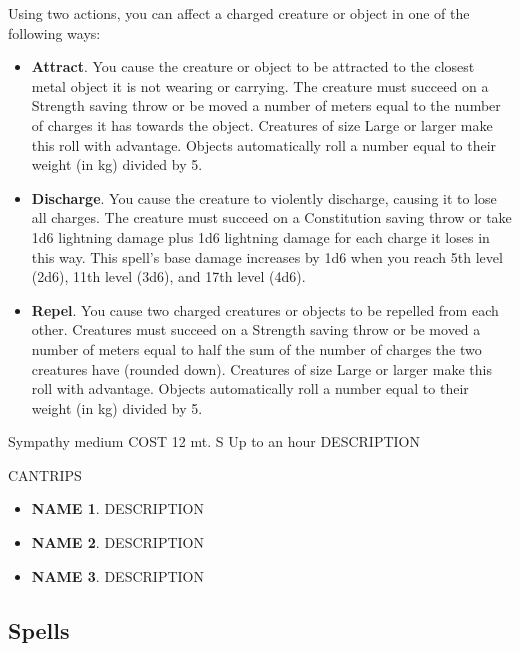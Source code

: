         Using two actions, you can affect a charged creature or object in one of the following ways:
        \begin{itemize}
            \item \textbf{Attract}.
            You cause the creature or object to be attracted to the closest metal object it is not wearing or carrying.
            The creature must succeed on a Strength saving throw or be moved a number of meters equal to the number of charges it has towards the object.
            Creatures of size Large or larger make this roll with advantage.
            Objects automatically roll a number equal to their weight (in kg) divided by 5.
            \item \textbf{Discharge}.
            You cause the creature to violently discharge, causing it to lose all charges.
            The creature must succeed on a Constitution saving throw or take 1d6 lightning damage plus 1d6 lightning damage for each charge it loses in this way.
            This spell's base damage increases by 1d6 when you reach 5th level (2d6), 11th level (3d6), and 17th level (4d6).
            \item \textbf{Repel}.
            You cause two charged creatures or objects to be repelled from each other.
            Creatures must succeed on a Strength saving throw or be moved a number of meters equal to half the sum of the number of charges the two creatures have (rounded down).
            Creatures of size Large or larger make this roll with advantage.
            Objects automatically roll a number equal to their weight (in kg) divided by 5.
        \end{itemize}
        {Sympathy medium}
        {COST}
        {12 mt.}
        {S}
        {Up to an hour}
        DESCRIPTION

        CANTRIPS
        \begin{itemize}
            \item \textbf{NAME 1}.
            DESCRIPTION
            \item \textbf{NAME 2}.
            DESCRIPTION
            \item \textbf{NAME 3}.
            DESCRIPTION
        \end{itemize}


\subsection*{Spells}
